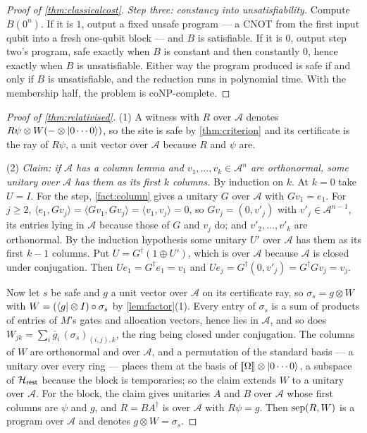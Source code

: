 \documentclass[acmsmall,screen,review,anonymous,nonacm]{acmart}
\begin{document}
\begin{proof}[Proof of \cref{thm:classicalcost}]
\emph{Step three: constancy into unsatisfiability.} Compute $B(0^{n})$. If it
is $1$, output a fixed unsafe program --- a CNOT from the first input qubit
into a fresh one-qubit block --- and $B$ is
satisfiable. If it is $0$, output step two's program, safe exactly when $B$
is constant and then constantly $0$, hence exactly when $B$ is
unsatisfiable. Either way the program produced is safe if and only if $B$ is
unsatisfiable, and the reduction runs in polynomial time.
With the membership half, the problem is coNP-complete.
\end{proof}

\begin{proof}[Proof of \cref{thm:relativised}]
(1) A witness with $R$ over $\mathcal A$ denotes
$R\psi \otimes W(- \otimes \lvert 0\cdots0 \rangle)$, so the site is safe by
\cref{thm:criterion} and its certificate is the ray of $R\psi$, a unit vector
over $\mathcal A$ because $R$ and $\psi$ are.

(2) \emph{Claim: if $\mathcal A$ has a column lemma and $v_1, \ldots,
v_k \in \mathcal A^{n}$ are orthonormal, some unitary over $\mathcal A$ has
them as its first $k$ columns.}
By induction on $k$. At $k = 0$ take $U = I$. For the step, \cref{fact:column}
gives a unitary $G$ over $\mathcal A$ with
$Gv_1 = e_1$. For $j \ge 2$, $\langle e_1, Gv_j\rangle = \langle Gv_1,
Gv_j\rangle = \langle v_1, v_j\rangle = 0$,
so $Gv_j = (0, v'_j)$ with $v'_j \in \mathcal A^{n-1}$, its entries lying in
$\mathcal A$ because those of $G$ and $v_j$ do; and $v'_2, \ldots, v'_k$ are
orthonormal. By the induction hypothesis some unitary $U'$ over $\mathcal A$
has them as its first $k-1$ columns. Put $U = G^{\dagger}(1 \oplus U')$, which
is over $\mathcal A$ because $\mathcal A$ is closed under conjugation. Then
$Ue_1 = G^{\dagger}e_1 = v_1$ and $Ue_j = G^{\dagger}(0, v'_j) =
G^{\dagger}Gv_j = v_j$.

Now let $s$ be safe and $g$ a unit vector over $\mathcal A$ on
its certificate ray, so $\sigma_s = g \otimes W$ with
$W = (\langle g \rvert \otimes I)\circ\sigma_s$ by \cref{lem:factor}(1). Every entry
of $\sigma_s$ is a sum of products of entries of $M$'s gates and allocation
vectors, hence lies in $\mathcal A$, and so does
$W_{jk} = \sum_i \bar g_i\,(\sigma_s)_{(i,j),k}$, the ring being closed under
conjugation. The columns of $W$ are orthonormal and over $\mathcal A$, and a
permutation of the standard basis --- a unitary over every ring --- places
them at the basis of $[\![\Omega]\!] \otimes \lvert 0\cdots0 \rangle$, a subspace of
$\mathcal{H}_{\mathsf{rest}}$ because the block is temporaries; so the claim extends
$W$ to a unitary over $\mathcal A$. For the block, the claim gives
unitaries $A$ and $B$ over $\mathcal A$ whose first columns are $\psi$ and
$g$, and $R = BA^{\dagger}$ is over $\mathcal A$ with $R\psi = g$. Then
$\mathrm{sep}(R,W)$ is a program over $\mathcal A$ and denotes
$g \otimes W = \sigma_s$.
\end{proof}
\end{document}
